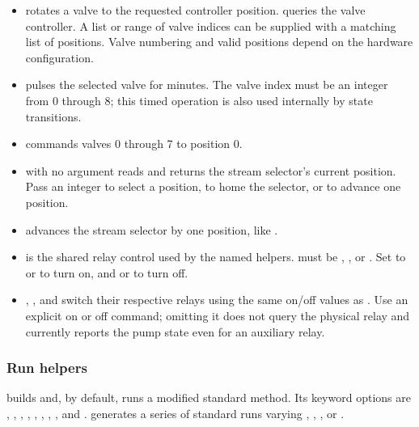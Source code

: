 \begin{itemize}
    \item {} rotates a valve to the requested
    controller position.  queries the valve controller.
    A list or range of valve indices can be supplied with a matching list of
    positions. Valve numbering and valid positions depend on the hardware
    configuration.
    \item {} pulses the selected valve for
     minutes. The valve index must be an integer from 0 through
    8; this timed operation is also used internally by state transitions.
    \item {} commands valves 0 through 7 to position 0.
    \item {} with no argument reads and returns the
    stream selector's current position. Pass an integer to select a position,
     to home the selector, or  to advance one
    position.
    \item {} advances the stream selector by one position, like
    .
    \item {} is the shared relay control used by
    the named helpers.  must be , , or
    . Set  to  or  to turn on,
    and  or  to turn off.
    \item {}, , and
     switch their respective relays using the same
    on/off values as . Use an explicit on or off command;
    omitting it does not query the physical relay and currently reports the
    pump state even for an auxiliary relay.
\end{itemize}

\subsubsection{Run helpers}

 builds and, by default, runs a modified standard
method. Its keyword options are , , ,
, , , , , and
.  generates a series of standard runs
varying , , , or .

